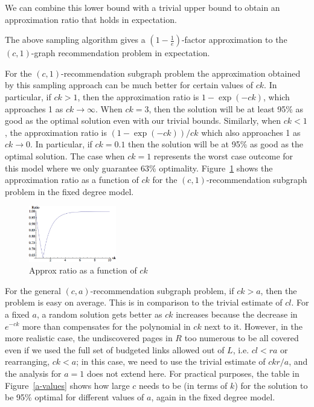 We can combine this lower bound with a trivial upper bound to obtain an
approximation ratio that holds in expectation.

\begin{thm}
The above sampling algorithm gives a $\left(1-\frac1e\right)$-factor approximation to the $(c,1)$-graph recommendation problem in expectation.
\end{thm}


For the $(c, 1)$-recommendation subgraph problem the approximation obtained by this
sampling approach can be much better for certain values of $ck$. In particular,
if $ck>1$, then the approximation ratio is $1-\exp(-ck)$, which
approaches 1 as $ck\to\infty$. When $ck=3$, then the
solution will be at least 95\% as good as the optimal solution even
with our trivial bounds. Similarly, when $ck<1$, the approximation
ratio is $(1-\exp(-ck))/ck$ which also approaches 1 as $ck\to 0$. In
particular, if $ck=0.1$ then the solution will be at 95\% as good as
the optimal solution. The case when $ck=1$ represents the
worst case outcome for this model where we only guarantee 63\%
optimality. Figure~\ref{fig:simple_approx} shows the approximation ratio as a
function of $ck$ for the $(c,1)$-recommendation subgraph problem in the fixed degree model.\vs

\begin{figure}[H]
  \centering
  \includegraphics[width=0.34\textwidth]{images/sri_Original.png}
  \caption{Approx ratio as a function of $ck$ }\label{fig:simple_approx}
\end{figure}

For the general $(c, a)$-recommendation subgraph problem, if $ck>a$,
then the problem is easy on average. This is in comparison to the
trivial estimate of $cl$. For a fixed $a$, a random solution gets
better as $ck$ increases because the decrease in $e^{-ck}$ more than
compensates for the polynomial in $ck$ next to it. However, in the
more realistic case, the undiscovered pages in $R$ too numerous to be all covered even if we used the full set of budgeted links allowed out of $L$, i.e. $cl < ra$ or rearranging, $ck<a$; in this case, we need to use the trivial estimate of
$ckr/a$, and the analysis for $a=1$ does not extend here. For practical purposes, the table
in Figure~\ref{a-values} shows how large $c$ needs to be (in terms of $k$) for the
solution to be 95\% optimal for different values of $a$, again in the fixed degree model.\vs

